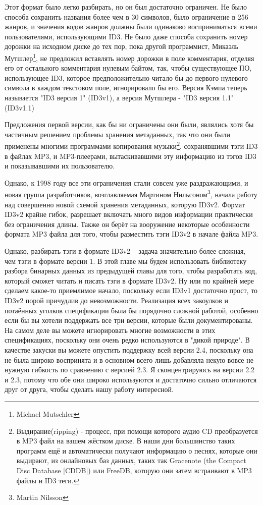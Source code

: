 Этот формат было легко разбирать, но он был достаточно ограничен. Не было способа
сохранить названия более чем в 30 символов, было ограничение в 256 жанров, и значения
кодов жанров должны были одинаково восприниматься всеми пользователями, использующими
ID3. Не было даже способа сохранить номер дорожки на исходном диске до тех пор, пока
другой программист, Микаэль Мутшлер\footnote{Michael Mutschler}, не предложил вставлять
номер дорожки в поле комментария, отделяя его от остального комментария нулевым байтом,
так, чтобы существующее ПО, использующее ID3, которое предположительно читало бы до
первого нулевого символа в каждом текстовом поле, игнорировало бы его. Версия Кэмпа теперь
называется "ID3 версия 1" (ID3v1), а версия Мутшлера - "ID3 версия 1.1" (ID3v1.1)

Предложения первой версии, как бы ни ограничены они были, являлись хотя бы частичным
решением проблемы хранения метаданных, так что они были применены многими программами
копирования музыки\footnote{Выдирание(ripping) - процесс, при помощи которого аудио CD
  преобразуется в MP3 файл на вашем жёстком диске. В наши дни большинство таких программ
  ещё и автоматически получают информацию о песнях, которые они выдирают, из онлайновых
  баз данных, таких так Gracenote (the Compact Disc Database [CDDB]) или FreeDB, которую
  они затем встраивают в MP3 файлы и ID3 теги.}, сохранявшими тэги ID3 в файлах MP3, и
MP3-плеерами, вытаскивавшими эту информацию из тэгов ID3 и показывавшими их пользователю.

Однако, к 1998 году все эти ограничения стали совсем уже раздражающими, и новая группа
разработчиков, возглавляемая Мартином Нильсоном\footnote{Martin Nilsson}, начала работу
над совершенно новой схемой хранения метаданных, которую ID3v2. Формат ID3v2 крайне гибок,
разрешает включать много видов информации практически без ограничения длины. Также он
берёт на вооружение некоторые особенности формата MP3 файла для того, чтобы разместить
тэги ID3v2 в начале файла MP3.

Однако, разбирать тэги в формате ID3v2 -- задача значительно более сложная, чем тэги в
формате версии 1. В этой главе мы будем использовать библиотеку разбора бинарных данных из
предыдущей главы для того, чтобы разработать код, который сможет читать и писать тэги в
формате ID3v2. Ну или по крайней мере сделаем какое-то приемлимое начало, поскольку если
ID3v1 достаточно прост, то ID3v2 порой причудлив до невозможности. Реализация всех
закоулков и потаённых уголков спецификации была бы порядочно сложной работой, особенно
если бы вы хотели поддержать все три версии, которые были документированы. На самом деле
вы можете игнорировать многие возможности в этих спецификациях, поскольку они очень редко
используются в "дикой природе".  В качестве закуски вы можете опустить поддержку всей
версии 2.4, поскольку она не была широко воспринята и в основном всего лишь добавляла
некую вовсе не нужную гибкость по сравнению с версией 2.3. Я сконцентрируюсь на версии 2.2
и 2.3, потому что обе они широко используются и достаточно сильно отличаются друг от
друга, чтобы сделать нашу работу интересной.


